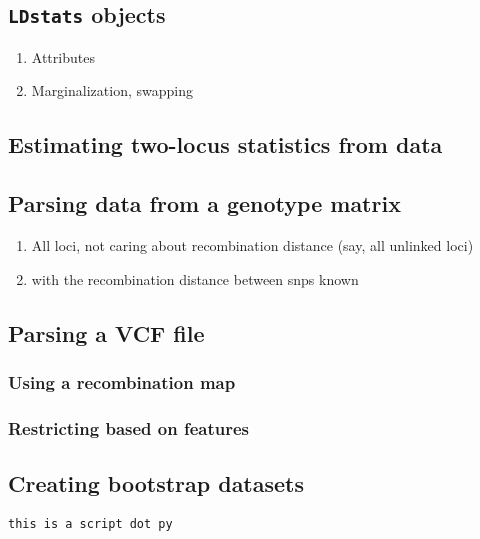 \documentclass[11pt]{article}
\renewcommand{\cite}{\citep}
\begin{document}
\subsection{\texttt{LDstats} objects}

\begin{enumerate}
\item Attributes
\item Marginalization, swapping
\end{enumerate}


\subsection{Estimating two-locus statistics from data}
\cite{Ragsdale2019}


\subsection{Parsing data from a genotype matrix}

\begin{enumerate}
\item All loci, not caring about recombination distance (say, all unlinked loci)
\item with the recombination distance between snps known
\end{enumerate}

\subsection{Parsing a VCF file}


\subsubsection{Using a recombination map}


\subsubsection{Restricting based on features}


\subsection{Creating bootstrap datasets}


\begin{lstlisting}[caption={\textbf{Parsing:} Example of parsing data generated by msprime}, float, label={lst:bottleneck}]
this is a script dot py
\end{lstlisting}
\end{document}
